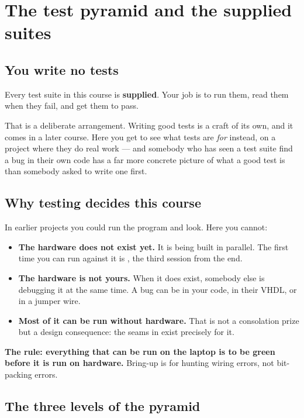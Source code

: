 \section{The test pyramid and the supplied suites}
\label{sec:pyramid}

\subsection{You write no tests}

Every test suite in this course is \textbf{supplied}. Your job is to run them, read them when they
fail, and get them to pass.

That is a deliberate arrangement. Writing good tests is a craft of its own, and it comes in a
later course. Here you get to see what tests are \emph{for} instead, on a project where they do
real work --- and somebody who has seen a test suite find a bug in their own code has a far more
concrete picture of what a good test is than somebody asked to write one first.

\subsection{Why testing decides this course}

In earlier projects you could run the program and look. Here you cannot:

\begin{itemize}
  \item \textbf{The hardware does not exist yet.} It is being built in parallel. The first time
    you can run against it is , the third session from the end.
  \item \textbf{The hardware is not yours.} When it does exist, somebody else is debugging it at
    the same time. A bug can be in your code, in their VHDL, or in a jumper wire.
  \item \textbf{Most of it can be run without hardware.} That is not a consolation prize but a
    design consequence: the seams in  exist precisely for it.
\end{itemize}

\textbf{The rule: everything that can be run on the laptop is to be green before it is run on
hardware.} Bring-up is for hunting wiring errors, not bit-packing errors.

\subsection{The three levels of the pyramid}

